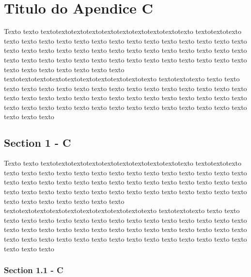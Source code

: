 %
%

\chapter{Titulo do Apendice C}\label{apen:apendiceC}

Texto texto textotextotextotextotextotextotextotextotextotexto textotextotexto texto texto texto texto texto texto texto texto texto texto texto texto texto texto texto texto texto texto texto texto texto texto texto texto texto texto texto texto texto texto texto texto texto texto texto texto texto texto texto texto texto texto texto texto texto texto texto texto texto textotextotextotextotextotextotextotextotextotexto textotextotexto texto texto texto texto texto texto texto texto texto texto texto texto texto texto texto texto texto texto texto texto texto texto texto texto texto texto texto texto texto texto texto texto texto texto texto texto texto texto texto texto texto texto texto texto texto texto texto 

\section{Section 1 - C}

Texto texto textotextotextotextotextotextotextotextotextotexto textotextotexto texto texto texto texto texto texto texto texto texto texto texto texto texto texto texto texto texto texto texto texto texto texto texto texto texto texto texto texto texto texto texto texto texto texto texto texto texto texto texto texto texto texto texto texto texto texto texto texto texto textotextotextotextotextotextotextotextotextotexto textotextotexto texto texto texto texto texto texto texto texto texto texto texto texto texto texto texto texto texto texto texto texto texto texto texto texto texto texto texto texto texto texto texto texto texto texto texto texto texto texto texto texto texto texto texto texto texto texto texto 

\subsection{Section 1.1 - C}

